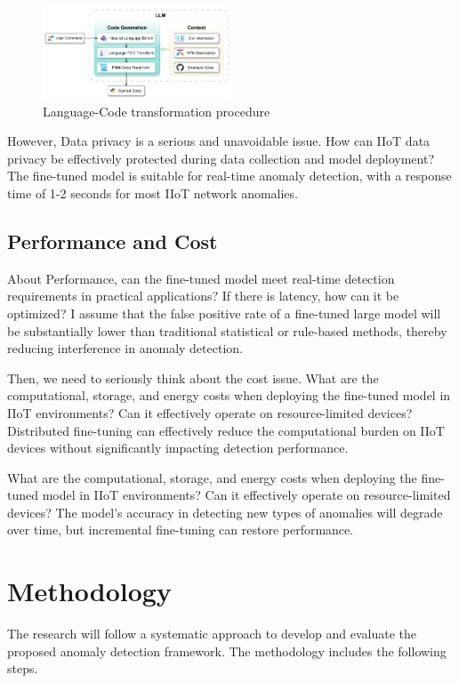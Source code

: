 \documentclass[usenatbib]{tjaa}
\begin{document}
\begin{figure} %
  \includegraphics[width=0.5\textwidth]{./img/language_code_trans_procedure.png} %
  \caption{Language-Code transformation procedure}
  \label{fig:fsmProcedure}
\end{figure}

However, Data privacy is a serious and unavoidable issue.
How can IIoT data privacy be effectively protected
during data collection and model deployment?
The fine-tuned model is suitable for real-time anomaly detection,
with a response time of 1-2 seconds for most IIoT network anomalies.

\subsection{Performance and Cost}
About Performance, can the fine-tuned model meet real-time detection requirements
in practical applications? If there is latency,
how can it be optimized?
I assume that the false positive rate of a fine-tuned large model will be
substantially lower than traditional statistical or rule-based methods,
thereby reducing interference in anomaly detection.

Then, we need to seriously think about the cost issue.
What are the computational, storage, and energy costs when deploying
the fine-tuned model in IIoT environments?
Can it effectively operate on resource-limited devices?
Distributed fine-tuning can effectively reduce the computational
burden on IIoT devices without significantly impacting
detection performance.

What are the computational, storage, and energy costs when
deploying the fine-tuned model in IIoT environments?
Can it effectively operate on resource-limited devices?
The model’s accuracy in detecting new types of anomalies will degrade over time,
but incremental fine-tuning can restore performance.

\section{Methodology}
\label{sec:methodology}
The research will follow a systematic approach to develop and evaluate
the proposed anomaly detection framework.
The methodology includes the following steps.
\end{document}
